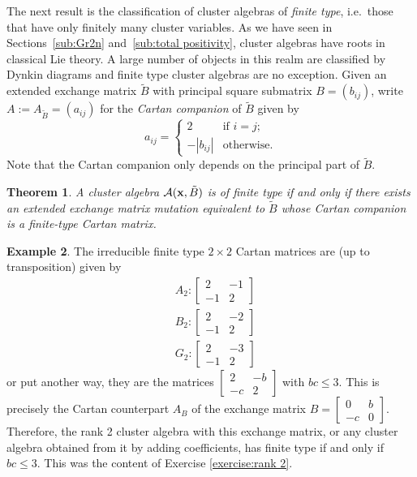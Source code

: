 \documentclass{amsart}
\newtheorem{theorem}{Theorem}[section]
\theoremstyle{definition}
\newtheorem{example}[theorem]{Example}
\theoremstyle{remark}
\numberwithin{equation}{section}
\newcommand{\cA}{{\mathcal{A}}}
\newcommand{\x}{{\bf x}}
\begin{document}
	The next result is the classification of cluster algebras of \emph{finite type}, i.e.\ those that have only finitely many cluster variables.  As we have seen in Sections~\ref{sub:Gr2n} and~\ref{sub:total positivity}, cluster algebras have roots in classical Lie theory.  A large number of objects in this realm are classified by Dynkin diagrams and finite type cluster algebras are no exception.  Given an extended exchange matrix $\tilde B$ with principal square submatrix $B=(b_{ij})$, write $A:=A_{\tilde B}=(a_{ij})$ for the \emph{Cartan companion} of $\tilde B$ given by 
  \[a_{ij}=\begin{cases}2 & \text{if $i=j$;}\\ -|b_{ij}| & \text{otherwise.}\end{cases}\]
  Note that the Cartan companion only depends on the principal part of $\tilde B$.
  \begin{theorem}\cite{FZ03}
    A cluster algebra $\cA(\x,\tilde B)$ is of finite type if and only if there exists an extended exchange matrix mutation equivalent to $\tilde B$ whose Cartan companion is a finite-type Cartan matrix.
  \end{theorem}
  \begin{example}
		The irreducible finite type $2 \times 2$ Cartan matrices are (up to transposition) given by
		\begin{align*}
		&A_2 : \left[\begin{array}{cc} 2 & -1\\ -1 & 2\end{array}\right] \\
		&B_2 : \left[\begin{array}{cc} 2 & -2\\ -1 & 2\end{array}\right] \\
		&G_2 : \left[\begin{array}{cc} 2 & -3\\ -1 & 2\end{array}\right]
		\end{align*}
		or put another way, they are the matrices $\left[\begin{array}{cc} 2 & -b\\ -c & 2\end{array}\right]$ with $bc \leq 3$.  This is precisely the Cartan counterpart $A_B$ of the exchange matrix $B=\left[\begin{array}{cc} 0 & b\\ -c & 0\end{array}\right]$.  Therefore, the rank 2 cluster algebra with this exchange matrix, or any cluster algebra obtained from it by adding coefficients, has finite type if and only if $bc \leq 3$.  This was the content of Exercise \ref{exercise:rank 2}.
		\end{example}
		
\end{document}
